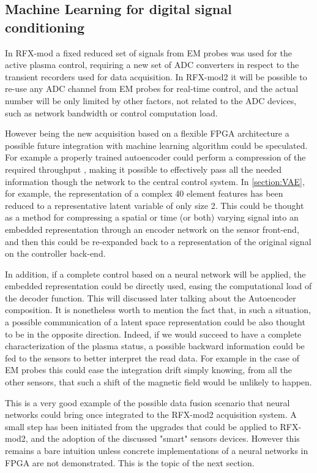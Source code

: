 \subsection*{Machine Learning for digital signal conditioning}

In RFX-mod a fixed reduced set of signals from EM probes was used for the active plasma control, requiring a new set of ADC converters in respect to the transient recorders used for data acquisition. In RFX-mod2 it will be possible to re-use any ADC channel from EM probes for real-time control, and the actual number will be only limited by other factors, not related to the ADC devices, such as network bandwidth or control computation load. 

However being the new acquisition based on a flexible FPGA architecture a possible future integration with machine learning algorithm could be speculated.
For example a properly trained autoencoder could perform a compression of the required throughput \cite{Zebang:2019:DCA:3313950.3313965}, making it possible to effectively pass all the needed information though the network to the central control system.
In \cref{section:VAE}, for example, the representation of a complex 40 element features has been reduced to a representative latent variable of only size 2. 
This could be thought as a method for compressing a spatial or time (or both) varying signal into an embedded representation through an encoder network on the sensor front-end, and then this could be re-expanded back to a representation of the original signal on the controller back-end.

In addition, if a complete control based on a neural network will be applied, the embedded representation could be directly used, easing the computational load of the decoder function. This will discussed later talking about the Autoencoder composition.
It is nonetheless worth to mention the fact that, in such a situation, a possible communication of a latent space representation could be also thought to be in the opposite direction. Indeed, if we would succeed to have a complete characterization of the plasma status, a possible backward information could be fed to the sensors to better interpret the read data.
For example in the case of EM probes this could ease the integration drift simply knowing, from all the other sensors, that such a shift of the magnetic field would be unlikely to happen.

This is a very good example of the possible data fusion scenario that neural networks could bring once integrated to the RFX-mod2 acquisition system.
A small step has been initiated from the upgrades that could be applied to RFX-mod2, and the adoption of the discussed "smart" sensors devices.
However this remains a bare intuition unless concrete implementations of a neural networks in FPGA are not demonstrated.
This is the topic of the next section.














